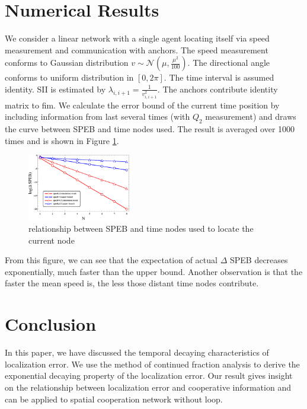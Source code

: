 \documentclass[conference]{IEEEtran}
\begin{document}
\section{Numerical Results}\label{numerical}
We consider a linear network with a single agent locating itself via speed measurement and communication with anchors. 
The speed measurement conforms to Gaussian distribution $v \sim \mathcal{N}(\mu,\frac{\mu^2}{100})$. 
The directional angle conforms to uniform distribution in $[0,2\pi]$. The time interval is assumed identity. 
SII is estimated by $\lambda_{i,i+1}=\frac{1}{v_{i,i+1}^2}$. The anchors contribute identity matrix to \ac{fim}. 
We calculate the error bound of the current time position by including information from last several times (with $Q_2$ measurement) 
and draws the curve between SPEB and time nodes used. The result is averaged over 1000 times and is shown in Figure \ref{FF2}.
\begin{figure}[!t]
\centering
\includegraphics[width=0.4\textwidth]{decreasing_exponential.eps}
\caption{relationship between SPEB and time nodes used to locate the current node}\label{FF2}
\end{figure}

From this figure, we can see that the expectation of actual $\Delta$ SPEB decreases exponentially, much faster than the upper bound.
Another observation is that the faster the mean speed is, the less those distant time nodes contribute.
\section{Conclusion}
In this paper, we have discussed the temporal decaying characteristics of localization error. 
We use the method of continued fraction analysis to derive the exponential decaying property of the localization error. 
Our result gives insight on the relationship between localization error and cooperative information 
and can be applied to spatial  cooperation network without loop.
\end{document}
